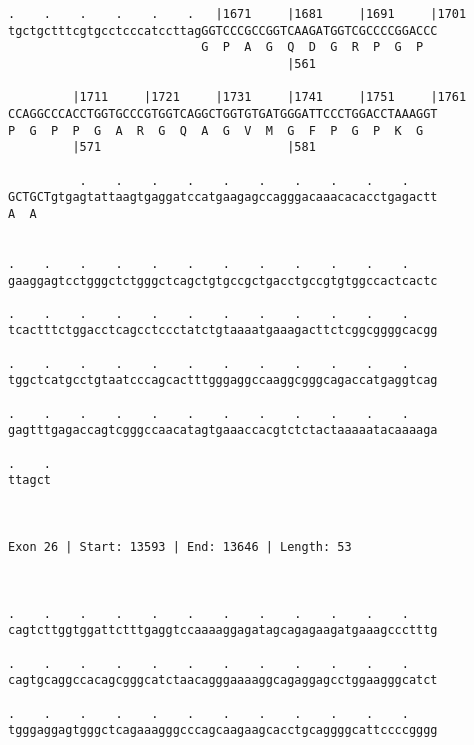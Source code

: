 \documentclass{article}
\begin{document}
\begin{Verbatim}
.    .    .    .    .    .   |1671     |1681     |1691     |1701
tgctgctttcgtgcctcccatccttagGGTCCCGCCGGTCAAGATGGTCGCCCCGGACCC
                           G  P  A  G  Q  D  G  R  P  G  P  
                                       |561                 
  
         |1711     |1721     |1731     |1741     |1751     |1761
CCAGGCCCACCTGGTGCCCGTGGTCAGGCTGGTGTGATGGGATTCCCTGGACCTAAAGGT
P  G  P  P  G  A  R  G  Q  A  G  V  M  G  F  P  G  P  K  G  
         |571                          |581                 
  
          .    .    .    .    .    .    .    .    .    .    
GCTGCTgtgagtattaagtgaggatccatgaagagccagggacaaacacacctgagactt
A  A                                                        
                                                            
  
.    .    .    .    .    .    .    .    .    .    .    .    
gaaggagtcctgggctctgggctcagctgtgccgctgacctgccgtgtggccactcactc
                                                            
.    .    .    .    .    .    .    .    .    .    .    .    
tcactttctggacctcagcctccctatctgtaaaatgaaagacttctcggcggggcacgg
                                                            
.    .    .    .    .    .    .    .    .    .    .    .    
tggctcatgcctgtaatcccagcactttgggaggccaaggcgggcagaccatgaggtcag
                                                            
.    .    .    .    .    .    .    .    .    .    .    .    
gagtttgagaccagtcgggccaacatagtgaaaccacgtctctactaaaaatacaaaaga
                                                            
.    .
ttagct
      
      
 
Exon 26 | Start: 13593 | End: 13646 | Length: 53



.    .    .    .    .    .    .    .    .    .    .    .    
cagtcttggtggattctttgaggtccaaaaggagatagcagagaagatgaaagccctttg
                                                            
.    .    .    .    .    .    .    .    .    .    .    .    
cagtgcaggccacagcgggcatctaacagggaaaaggcagaggagcctggaagggcatct
                                                            
.    .    .    .    .    .    .    .    .    .    .    .    
tgggaggagtgggctcagaaagggcccagcaagaagcacctgcaggggcattccccgggg
                                                            

\end{Verbatim}
\end{document}
